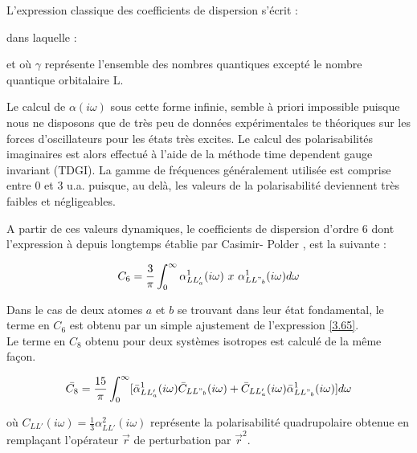 L'expression classique des coefficients de dispersion s'écrit : 
	
\begin{center}
\end{center}
		
dans laquelle : 
	
\begin{center}
\end{center}
	
et où $\gamma$ représente l'ensemble des nombres quantiques excepté le nombre quantique orbitalaire L.
	
Le calcul de $\alpha(i\omega)$ sous cette forme infinie, semble à priori impossible puisque nous ne disposons que de très peu de données expérimentales te théoriques sur les forces d'oscillateurs pour les états très excites. Le calcul des polarisabilités imaginaires est alors effectué à l'aide de la méthode time dependent gauge invariant (TDGI). La gamme de fréquences généralement utilisée est comprise entre 0 et 3 u.a. puisque, au delà, les valeurs de la polarisabilité deviennent très faibles et négligeables.
	
A partir de ces valeurs dynamiques, le coefficients de dispersion d'ordre 6 dont l'expression à depuis longtemps établie par Casimir- Polder \cite{casimir1948influence}, est la suivante : 
	
\begin{equation}
C_{6}= \frac{3}{\pi} \int_{0}^{\infty} \alpha_{LL'_{a}}^{1} (i\omega)\ x \ \alpha_{LL"_{b}}^{1} (i\omega) d\omega \label{3.65}
\end{equation}
	
Dans le cas de deux atomes $a$ et $b$ se trouvant dans leur état fondamental, le terme en $C_{6}$ est obtenu par un simple ajustement de l'expression \ref{3.65}.\\
	
Le terme en $C_{8}$ obtenu pour deux systèmes isotropes est calculé de la même façon. 
	
\begin{equation}
\bar{C_{8}} = \frac{15}{\pi} \int_{0}^{\infty} [\bar{\alpha}_{LL'_{a}}^{1} (i\omega) \bar{C}_{LL"_{b}} (i\omega) + \bar{C}_{LL'_{a}} (i\omega) \bar{\alpha}_{LL"_{b}}^{1} (i\omega)] d\omega
\end{equation}
	
où $C_{LL'}(i\omega) = \frac{1}{3} \alpha^{2}_{LL'}(i\omega)$ \cite{orr1971perturbation} représente la polarisabilité quadrupolaire obtenue en remplaçant l'opérateur $\overrightarrow{r}$ de perturbation par $\overrightarrow{r}^{2}$.
	
			

